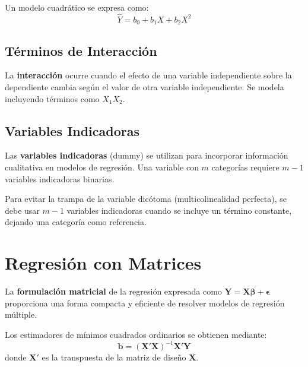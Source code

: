 Un modelo cuadrático se expresa como:
$$\hat{Y} = b_0 + b_1 X + b_2 X^2$$

\subsection{Términos de Interacción}

\begin{definition}
La \textbf{interacción} ocurre cuando el efecto de una variable independiente sobre la dependiente cambia según el valor de otra variable independiente. Se modela incluyendo términos como $X_1 X_2$.
\end{definition}

\subsection{Variables Indicadoras}

\begin{definition}
Las \textbf{variables indicadoras} (dummy) se utilizan para incorporar información cualitativa en modelos de regresión. Una variable con $m$ categorías requiere $m-1$ variables indicadoras binarias.
\end{definition}

\begin{remark}
Para evitar la trampa de la variable dicótoma (multicolinealidad perfecta), se debe usar $m-1$ variables indicadoras cuando se incluye un término constante, dejando una categoría como referencia.
\end{remark}

\section{Regresión con Matrices}

\begin{definition}
La \textbf{formulación matricial} de la regresión expresada como $\mathbf{Y} = \mathbf{X}\boldsymbol{\beta} + \boldsymbol{\epsilon}$ proporciona una forma compacta y eficiente de resolver modelos de regresión múltiple.
\end{definition}

\begin{theorem}
Los estimadores de mínimos cuadrados ordinarios se obtienen mediante:
$$\mathbf{b} = (\mathbf{X}'\mathbf{X})^{-1}\mathbf{X}'\mathbf{Y}$$
donde $\mathbf{X}'$ es la transpuesta de la matriz de diseño $\mathbf{X}$.
\end{theorem}

